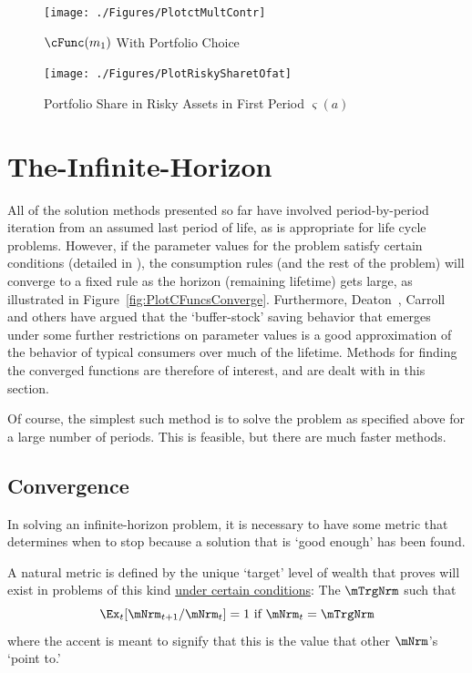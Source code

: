 \documentclass[titlepage, headings=optiontotocandhead]{\econtex}
\begin{document}
\hypertarget{PlotctMultContr}{}
\begin{figure}
  \texttt{[image: ./Figures/PlotctMultContr]}
  \caption{$\cFunc({m}_{1})$ With Portfolio Choice}
  \label{fig:PlotctMultContr}
\end{figure}

\hypertarget{PlotRiskySharetOfat}{}
\begin{figure}
  \texttt{[image: ./Figures/PlotRiskySharetOfat]}
  \caption{Portfolio Share in Risky Assets in First Period $\varsigma({a})$}
  \label{fig:PlotRiskySharetOfat}
\end{figure}

\hypertarget{The-Infinite-Horizon}{}
\section{The-Infinite-Horizon}

All of the solution methods presented so far have involved
period-by-period iteration from an assumed last period of life, as is
appropriate for life cycle problems.  However, if the parameter values
for the problem satisfy certain conditions (detailed in
\cite{BufferStockTheory}), the consumption rules (and the rest of
the problem) will converge to a fixed rule as the horizon (remaining
lifetime) gets large, as illustrated in
Figure~\ref{fig:PlotCFuncsConverge}.  Furthermore,
Deaton~\citeyearpar{deatonLiqConstr},
Carroll~\citeyearpar{carroll:brookings,carrollBSLCPIH} and others
have argued that the `buffer-stock' saving behavior that emerges under
some further restrictions on parameter values is a good approximation
of the behavior of typical consumers over much of the lifetime.
Methods for finding the converged functions are therefore of interest,
and are dealt with in this section.

Of course, the simplest such method is to solve the problem as
specified above for a large number of periods.  This is feasible, but
there are much faster methods.

\subsection{Convergence}

In solving an infinite-horizon problem, it is necessary to have some
metric that determines when to stop because a solution that is `good
enough' has been found.

A natural metric is defined by the unique `target' level of wealth that \cite{BufferStockTheory} proves
will exist in problems of this kind \href{https://llorracc.github.io/BufferStockTheory#GICNrm}{under certain conditions}: The $\mTrgNrm$ such that
\begin{equation}
  \Ex_t [{\mNrm}_{t+1}/\mNrm_t] = 1 \mbox{~if~} \mNrm_t = \mTrgNrm  \label{eq:mTrgNrmet}
\end{equation}
where the accent is meant to signify that this is the value
that other $\mNrm$'s `point to.'
\end{document}
